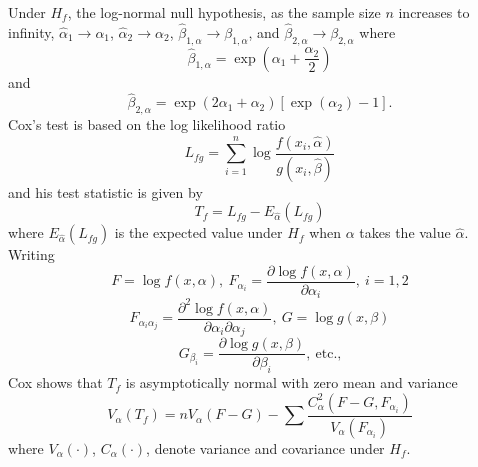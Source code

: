 \documentclass[draft]{article}
\begin{document}
Under \(H_f\), the log-normal null hypothesis, as the sample
size \(n\) increases to infinity,
\(\hat{\alpha}_1\rightarrow\alpha_1\),
\(\hat{\alpha}_2\rightarrow\alpha_2\),
\(\hat{\beta}_{1,\alpha}\rightarrow\beta_{1,\alpha}\),
and
\(\hat{\beta}_{2,\alpha}\rightarrow\beta_{2,\alpha}\)
where
\begin{equation}
\hat{\beta}_{1,\alpha}=\exp\left(\alpha_1+\frac{\alpha_2}{2}\right)
\end{equation}
and
\begin{equation}
\hat{\beta}_{2,\alpha}=\exp
\left(2\alpha_1+\alpha_2\right)
\left[\exp\left(\alpha_2\right) -1\right].
\end{equation}
Cox's test is based on the log likelihood ratio
\begin{equation}
L_{fg}=\sum_{i=1}^n\log
\frac{f\left(x_i,\hat{\alpha}\right)}
     {g\left(x_i,\hat{\beta}\right)}
\end{equation}
and his test statistic is given by
\begin{equation}
T_f=L_{fg}-E_{\hat{\alpha}}\left(L_{fg}\right)
\end{equation}
where \(E_{\hat{\alpha}}\left(L_{fg}\right)\) is the expected
value under \(H_f\) when \(\alpha\) takes the value
\(\hat\alpha\). Writing
\begin{equation}
F=\log f\left(x,\alpha\right), \:
F_{\alpha_i} = \frac{\partial\log f\left(x,\alpha\right)}{\partial\alpha_i},\:
i=1,2
\end{equation}
\null\begin{equation}
F_{\alpha_i\alpha_j} = \frac{\partial^2\log f\left(x,\alpha\right)}
{\partial\alpha_i\partial\alpha_j}, \:
G = \log g\left(x,\beta\right)
\end{equation}
\null\begin{equation}
G_{\beta_i}=\frac{\partial\log g\left(x,\beta\right)}{\partial\beta_i}, \:
\mbox{etc.,}
\end{equation}
Cox shows that \(T_f\) is asymptotically normal with zero mean and
variance
\begin{equation}
V_\alpha\left(T_f\right)=
nV_\alpha\left(F-G\right) -
\sum\frac{C_\alpha^2\left(F-G, F_{\alpha_i}\right)}
         {V_\alpha\left(F_{\alpha_i}\right)}
\end{equation}
where \(V_\alpha\left(\cdot\right)\),
\(C_\alpha\left(\cdot\right)\), denote variance and covariance under \(H_f\).
\end{document}
